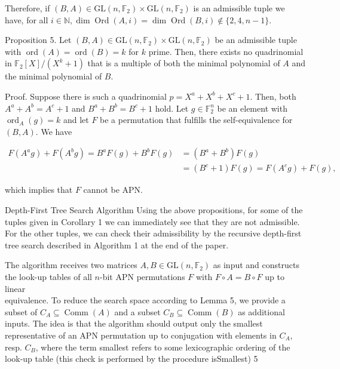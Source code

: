 \documentclass[10pt]{article}
\begin{document}
Therefore, if $(B, A) \in \mathrm{GL}\left(n, \mathbb{F}_{2}\right) \times \mathrm{GL}\left(n, \mathbb{F}_{2}\right)$ is an admissible tuple we have, for all $i \in \mathbb{N}, \operatorname{dim} \operatorname{Ord}(A, i)=\operatorname{dim} \operatorname{Ord}(B, i) \notin\{2,4, n-1\}$.

Proposition 5. Let $(B, A) \in \mathrm{GL}\left(n, \mathbb{F}_{2}\right) \times \mathrm{GL}\left(n, \mathbb{F}_{2}\right)$ be an admissible tuple with $\operatorname{ord}(A)= \operatorname{ord}(B)=k$ for $k$ prime. Then, there exists no quadrinomial in $\mathbb{F}_{2}[X] /\left(X^{k}+1\right)$ that is a multiple of both the minimal polynomial of $A$ and the minimal polynomial of $B$.

Proof. Suppose there is such a quadrinomial $p=X^{a}+X^{b}+X^{c}+1$. Then, both $A^{a}+A^{b}=A^{c}+1$ and $B^{a}+B^{b}=B^{c}+1$ hold. Let $g \in \mathbb{F}_{2}^{n}$ be an element with $\operatorname{ord}_{A}(g)=k$ and let $F$ be a permutation that fulfills the self-equivalence for $(B, A)$. We have

$$
\begin{aligned}
F\left(A^{a} g\right)+F\left(A^{b} g\right)=B^{a} F(g)+B^{b} F(g) & =\left(B^{a}+B^{b}\right) F(g) \\
& =\left(B^{c}+1\right) F(g)=F\left(A^{c} g\right)+F(g),
\end{aligned}
$$

which implies that $F$ cannot be APN.

Depth-First Tree Search Algorithm Using the above propositions, for some of the tuples given in Corollary 1 we can immediately see that they are not admissible. For the other tuples, we can check their admissibility by the recursive depth-first tree search described in Algorithm 1 at the end of the paper.

The algorithm receives two matrices $A, B \in \mathrm{GL}\left(n, \mathbb{F}_{2}\right)$ as input and constructs the look-up tables of all $n$-bit APN permutations $F$ with $F \circ A=B \circ F$ up to linear\\
equivalence. To reduce the search space according to Lemma 5, we provide a subset of $C_{A} \subseteq \operatorname{Comm}(A)$ and a subset $C_{B} \subseteq \operatorname{Comm}(B)$ as additional inputs. The idea is that the algorithm should output only the smallest representative of an APN permutation up to conjugation with elements in $C_{A}$, resp. $C_{B}$, where the term smallest refers to some lexicographic ordering of the look-up table (this check is performed by the procedure isSmallest) 5
\end{document}
